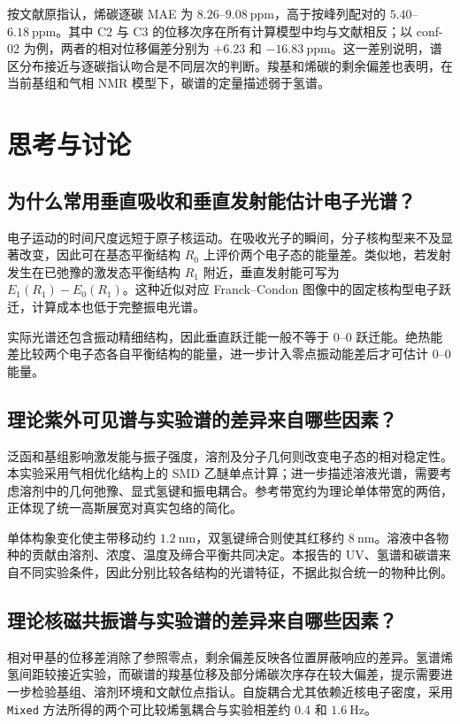 \documentclass[a4paper,12pt]{article}
\begin{document}
按文献原指认，烯碳逐碳 MAE 为 $8.26$--$9.08\ \mathrm{ppm}$，高于按峰列配对的 $5.40$--$6.18\ \mathrm{ppm}$。其中 C2 与 C3 的位移次序在所有计算模型中均与文献相反；以 conf-02 为例，两者的相对位移偏差分别为 $+6.23$ 和 $-16.83\ \mathrm{ppm}$。这一差别说明，谱区分布接近与逐碳指认吻合是不同层次的判断。羧基和烯碳的剩余偏差也表明，在当前基组和气相 NMR 模型下，碳谱的定量描述弱于氢谱。

\clearpage
\section{思考与讨论}
\subsection{为什么常用垂直吸收和垂直发射能估计电子光谱？}
电子运动的时间尺度远短于原子核运动。在吸收光子的瞬间，分子核构型来不及显著改变，因此可在基态平衡结构 $R_0$ 上评价两个电子态的能量差。类似地，若发射发生在已弛豫的激发态平衡结构 $R_1$ 附近，垂直发射能可写为 $E_1(R_1)-E_0(R_1)$。这种近似对应 Franck--Condon 图像中的固定核构型电子跃迁，计算成本也低于完整振电光谱。

实际光谱还包含振动精细结构，因此垂直跃迁能一般不等于 0--0 跃迁能。绝热能差比较两个电子态各自平衡结构的能量，进一步计入零点振动能差后才可估计 0--0 能量。

\subsection{理论紫外可见谱与实验谱的差异来自哪些因素？}
泛函和基组影响激发能与振子强度，溶剂及分子几何则改变电子态的相对稳定性。本实验采用气相优化结构上的 SMD 乙醚单点计算；进一步描述溶液光谱，需要考虑溶剂中的几何弛豫、显式氢键和振电耦合。参考带宽约为理论单体带宽的两倍，正体现了统一高斯展宽对真实包络的简化。

单体构象变化使主带移动约 $1.2\ \mathrm{nm}$，双氢键缔合则使其红移约 $8\ \mathrm{nm}$。溶液中各物种的贡献由溶剂、浓度、温度及缔合平衡共同决定。本报告的 UV、氢谱和碳谱来自不同实验条件，因此分别比较各结构的光谱特征，不据此拟合统一的物种比例。

\subsection{理论核磁共振谱与实验谱的差异来自哪些因素？}
相对甲基的位移差消除了参照零点，剩余偏差反映各位置屏蔽响应的差异。氢谱烯氢间距较接近实验，而碳谱的羧基位移及部分烯碳次序存在较大偏差，提示需要进一步检验基组、溶剂环境和文献位点指认。自旋耦合尤其依赖近核电子密度，采用 \texttt{Mixed} 方法所得的两个可比较烯氢耦合与实验相差约 0.4 和 $1.6\ \mathrm{Hz}$。
\end{document}
